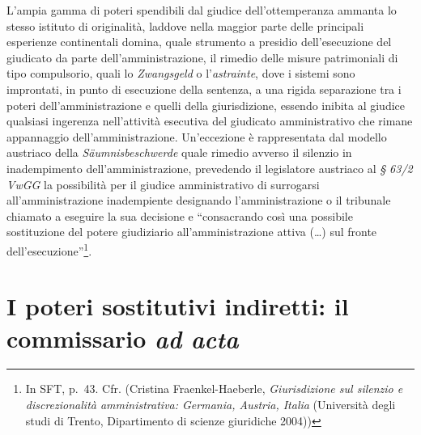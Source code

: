 \documentclass[12pt,it,a4paper,]{report}
\begin{document}
L'ampia gamma di poteri spendibili dal giudice dell'ottemperanza ammanta
lo stesso istituto di originalità, laddove nella maggior parte delle
principali esperienze continentali domina, quale strumento a presidio
dell'esecuzione del giudicato da parte dell'amministrazione, il rimedio
delle misure patrimoniali di tipo compulsorio, quali lo
\emph{Zwangsgeld} o l'\emph{astrainte}, dove i sistemi sono improntati,
in punto di esecuzione della sentenza, a una rigida separazione tra i
poteri dell'amministrazione e quelli della giurisdizione, essendo
inibita al giudice qualsiasi ingerenza nell'attività esecutiva del
giudicato amministrativo che rimane appannaggio dell'amministrazione.
Un'eccezione è rappresentata dal modello austriaco della
\emph{Säumnisbeschwerde} quale rimedio avverso il silenzio in
inadempimento dell'amministrazione, prevedendo il legislatore austriaco
al \emph{§ 63/2 VwGG} la possibilità per il giudice amministrativo di
surrogarsi all'amministrazione inadempiente designando l'amministrazione
o il tribunale chiamato a eseguire la sua decisione e ``consacrando così
una possibile sostituzione del potere giudiziario all'amministrazione
attiva (\ldots) sul fronte dell'esecuzione''\footnote{In SFT, p.~43.
  Cfr. (Cristina Fraenkel-Haeberle, \emph{Giurisdizione sul silenzio e
  discrezionalità amministrativa: Germania, Austria, Italia} (Università
  degli studi di Trento, Dipartimento di scienze giuridiche 2004))}.

\hypertarget{i-poteri-sostitutivi-indiretti-il-commissario-ad-acta}{%
\section{\texorpdfstring{I poteri sostitutivi indiretti: il commissario
\emph{ad
acta}}{I poteri sostitutivi indiretti: il commissario ad acta}}\label{i-poteri-sostitutivi-indiretti-il-commissario-ad-acta}}
\end{document}
